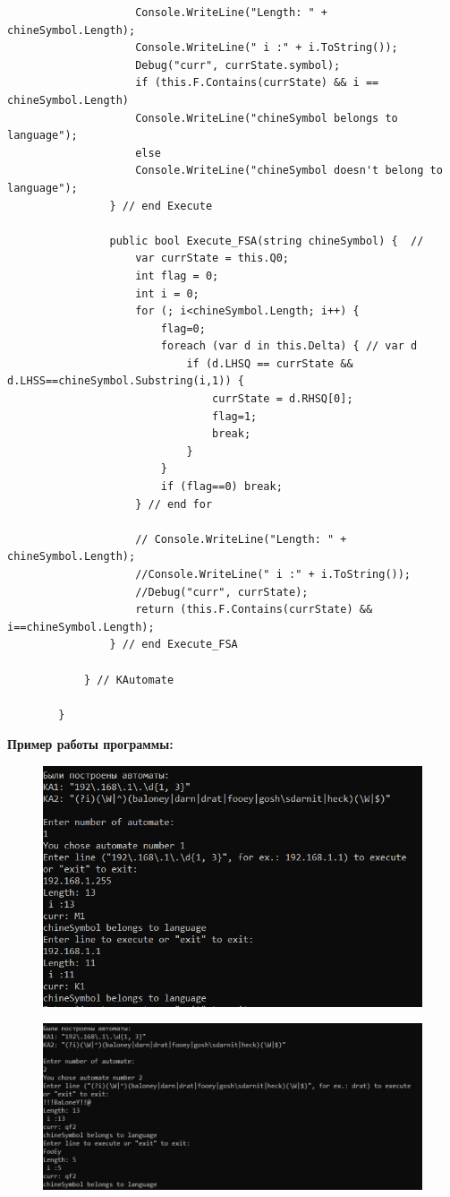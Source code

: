 \documentclass[a4paper,10pt]{article}
\begin{document}
\begin{lstlisting}
					Console.WriteLine("Length: " + chineSymbol.Length);
					Console.WriteLine(" i :" + i.ToString());
					Debug("curr", currState.symbol);
					if (this.F.Contains(currState) && i == chineSymbol.Length)
					Console.WriteLine("chineSymbol belongs to language");
					else
					Console.WriteLine("chineSymbol doesn't belong to language");
				} // end Execute
				
				public bool Execute_FSA(string chineSymbol) {  // 
					var currState = this.Q0; 
					int flag = 0;
					int i = 0;
					for (; i<chineSymbol.Length; i++) {
						flag=0;
						foreach (var d in this.Delta) { // var d
							if (d.LHSQ == currState && d.LHSS==chineSymbol.Substring(i,1)) {
								currState = d.RHSQ[0]; 
								flag=1;
								break;
							}
						}
						if (flag==0) break;
					} // end for
					
					// Console.WriteLine("Length: " + chineSymbol.Length);
					//Console.WriteLine(" i :" + i.ToString());
					//Debug("curr", currState);
					return (this.F.Contains(currState) && i==chineSymbol.Length);
				} // end Execute_FSA
				
			} // KAutomate
			
		}  
	\end{lstlisting}
	\newpage
	\textbf{Пример работы программы:}
	\begin{figure}[h]
		\centering
		\includegraphics[]{3.png}
		\label{fig:mpr}
	\end{figure}
	\begin{figure}[h]
		\centering
		\includegraphics[]{4.png}
		\label{fig:mpr}
	\end{figure}
	
\end{document}
